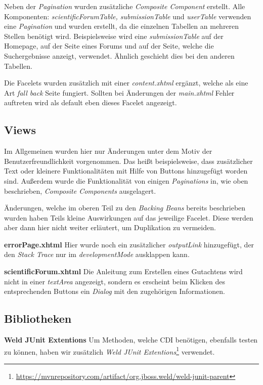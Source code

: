 Neben der \emph{Pagination} wurden zusätzliche \emph{Composite Component} erstellt. Alle Komponenten: \emph{scientificForumTable, submissionTable} und \emph{userTable} verwenden eine  \emph{Pagination} und wurden erstellt, da die einzelnen Tabellen an mehreren Stellen benötigt wird. Beispielsweise wird eine \emph{submissionTable} auf der Homepage, auf der Seite eines Forums und auf der Seite, welche die Suchergebnisse anzeigt, verwendet. Ähnlich geschieht dies bei den anderen Tabellen.

Die Facelets wurden zusätzlich mit einer \emph{content.xhtml} ergänzt, welche als eine Art \emph{fall back} Seite fungiert. Sollten  bei Änderungen der \emph{main.xhtml} Fehler auftreten wird als default eben dieses Facelet angezeigt.

\subsection{Views}

Im Allgemeinen wurden hier nur Änderungen unter dem Motiv der Benutzerfreundlichkeit vorgenommen. Das heißt beispielsweise, dass zusätzlicher Text oder kleinere Funktionalitäten mit Hilfe von Buttons hinzugefügt worden sind. Außerdem wurde die Funktionalität von einigen \emph{Paginations} in, wie oben beschrieben, \emph{Composite Components} ausgelagert.

Änderungen, welche im oberen Teil zu den \emph{Backing Beans} bereits beschrieben wurden haben Teils kleine Auswirkungen auf das jeweilige Facelet. Diese werden aber dann hier nicht weiter erläutert, um Duplikation zu vermeiden.

\textbf{errorPage.xhtml} Hier wurde noch ein zusätzlicher \emph{outputLink} hinzugefügt, der den \emph{Stack Trace} nur im \emph{developmentMode} ausklappen kann.

\textbf{scientificForum.xhtml} Die Anleitung zum Erstellen eines Gutachtens wird nicht in einer \emph{textArea} angezeigt, sondern es erscheint beim Klicken des entsprechenden Buttons ein \emph{Dialog} mit den zugehörigen Informationen.

\subsection{Bibliotheken}

\textbf{Weld JUnit Extentions} Um Methoden, welche CDI benötigen, ebenfalls testen zu können, haben wir zusätzlich \emph{Weld JUnit Extentions}\footnote{\url{https://mvnrepository.com/artifact/org.jboss.weld/weld-junit-parent}} verwendet.


